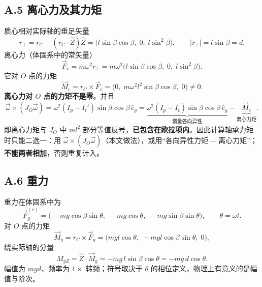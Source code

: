 \subsection*{A.5 离心力及其力矩}

质心相对实际轴的垂足矢量
\begin{equation}
r_\perp=r_C-(r_C\cdot\hat Z)\hat Z
=\bigl(l\sin\beta\cos\beta,\;0,\;l\sin^2\beta\bigr),
\qquad |r_\perp|=l\sin\beta=d .
\end{equation}
离心力（体固系中的常矢量）
\begin{equation}
\vec F_c=m\omega^2r_\perp
=m\omega^2\bigl(l\sin\beta\cos\beta,\;0,\;l\sin^2\beta\bigr).
\end{equation}
它对 $O$ 点的力矩
\begin{equation}
\vec M_c=r_C\times\vec F_c
=\bigl(0,\;m\omega^2l^2\sin\beta\cos\beta,\;0\bigr)\neq0 .
\label{eq:app-Mc}
\end{equation}
\textbf{离心力对 $O$ 点的力矩不是零}。并且
\begin{equation}
\vec\omega\times(J_O\vec\omega)
=\omega^2(I_p-I_t')\sin\beta\cos\beta\,\hat e_y
=\underbrace{\omega^2(I_p-I_t)\sin\beta\cos\beta\,\hat e_y}_{\text{惯量各向异性}}
-\underbrace{\vec M_c}_{\text{离心力矩}} .
\label{eq:app-split}
\end{equation}
即离心力矩与 $J_O$ 中 $ml^2$ 部分等值反号，\textbf{已包含在欧拉项内}。因此计算轴承力矩时只能二选一：用 $\vec\omega\times(J_O\vec\omega)$（本文做法），或用“各向异性力矩 $-$ 离心力矩”；\textbf{不能两者相加}，否则重复计入。

\subsection*{A.6 重力}

重力在体固系中为
\begin{equation}
\vec F_g^{(r)}=\bigl(-mg\cos\beta\sin\theta,\;-mg\cos\theta,\;-mg\sin\beta\sin\theta\bigr),
\qquad \theta=\omega t .
\end{equation}
对 $O$ 点的力矩
\begin{equation}
\vec M_g=r_C\times\vec F_g
=\bigl(mgl\cos\theta,\;-mgl\cos\beta\sin\theta,\;0\bigr),
\end{equation}
绕实际轴的分量
\begin{equation}
M_{gZ}=\hat Z\cdot\vec M_g=-mg\,l\sin\beta\cos\theta=-mg\,d\cos\theta .
\label{eq:app-MgZ}
\end{equation}
幅值为 $mgd$、频率为 $1\times$ 转频；符号取决于 $\theta$ 的相位定义，物理上有意义的是幅值与阶次。

